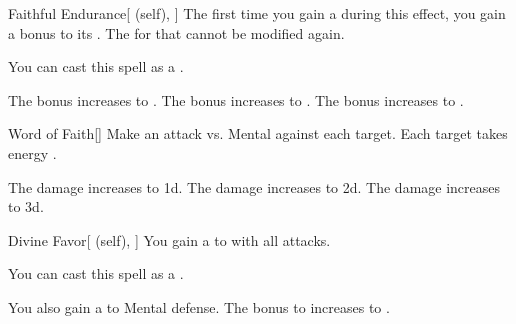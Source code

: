 \lowercase{\hypertarget{spell:Faithful Endurance}{}}\label{spell:Faithful Endurance}
\begin{attuneability}[Rank 1]{\hypertarget{spell:Faithful Endurance}{Faithful Endurance}}[ (self), ]
The first time you gain a  during this effect, you gain a  bonus to its .
The  for that  cannot be modified again.

You can cast this spell as a .

\rankline
{} The bonus increases to .
 The bonus increases to .
 The bonus increases to .
\end{attuneability}
\vspace{0.25em}



\lowercase{\hypertarget{spell:Word of Faith}{}}\label{spell:Word of Faith}
\begin{freeability}[Rank 1]{\hypertarget{spell:Word of Faith}{Word of Faith}}[]
Make an attack vs. Mental against each target.
\hit Each target takes energy .

\rankline
{} The damage increases to  \plus1d.
 The damage increases to  \plus2d.
 The damage increases to  \plus3d.
\end{freeability}
\vspace{0.25em}



\lowercase{\hypertarget{spell:Divine Favor}{}}\label{spell:Divine Favor}
\begin{attuneability}[Rank 3]{\hypertarget{spell:Divine Favor}{Divine Favor}}[ (self), ]
You gain a   to  with all attacks.

You can cast this spell as a .

\rankline
{} You also gain a   to Mental defense.
 The bonus to  increases to .
\end{attuneability}
\vspace{0.25em}



